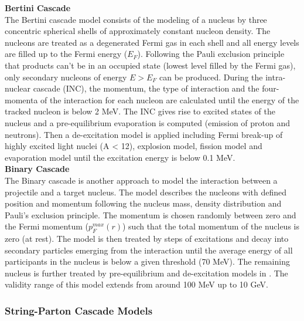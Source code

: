 \textbf{Bertini Cascade}\\

The Bertini cascade model \cite{Heikkinen2003} consists of the modeling of a nucleus by three concentric spherical shells of approximately constant nucleon density. The nucleons are treated as a degenerated Fermi gas in each shell and all energy levels are filled up to the Fermi energy ($E_F$). Following the Pauli exclusion principle that products can't be in an occupied state (lowest level filled by the Fermi gas), only secondary nucleons of energy $E > E_F$ can be produced. During the intra-nuclear cascade (INC), the momentum, the type of interaction and the four-momenta of the interaction for each nucleon are calculated until the energy of the tracked nucleon is below 2 MeV. The INC gives rise to excited states of the nucleus and a pre-equilibrium evaporation is computed (emission of proton and neutrons). Then a de-excitation model is applied including Fermi break-up of highly excited light nuclei (A < 12), explosion model, fission model and evaporation model until the excitation energy is below 0.1 MeV.\\

\textbf{Binary Cascade}\\

The Binary cascade \cite{Folger2004} is another approach to model the interaction between a projectile and a target nucleus. The model describes the nucleons with defined position and momentum following the nucleus mass, density distribution and Pauli's exclusion principle. The momentum is chosen randomly between zero and the Fermi momentum ($p_{F}^{max}(r)$) such that the total momentum of the nucleus is zero (at rest). The model is then treated by steps of excitations and decay into secondary particles emerging from the interaction until the average energy of all participants in the nucleus is below a given threshold (70 MeV). The remaining nucleus is further treated by pre-equilibrium and de-excitation models in \geant. The validity range of this model extends from around 100 MeV up to 10 GeV.

\subsubsection{String-Parton Cascade Models}

